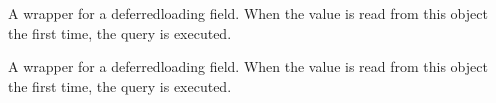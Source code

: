 \documentclass[a4paper,11pt,spanish]{sphinxmanual}
\begin{document}
\begin{fulllineitems}
\begin{fulllineitems}
\label{\detokenize{api/inventory/inventory.models:inventory.models.InventoryMovement.unidad}}
\pysigstartsignatures
\pysigline
{}
\pysigstopsignatures
\sphinxAtStartPar
A wrapper for a deferred\sphinxhyphen{}loading field. When the value is read from this
object the first time, the query is executed.

\end{fulllineitems}


\begin{fulllineitems}
\label{\detokenize{api/inventory/inventory.models:inventory.models.InventoryMovement.valor_unitario}}
\pysigstartsignatures
\pysigline
{}
\pysigstopsignatures
\sphinxAtStartPar
A wrapper for a deferred\sphinxhyphen{}loading field. When the value is read from this
object the first time, the query is executed.

\end{fulllineitems}


\end{fulllineitems}

\end{document}
